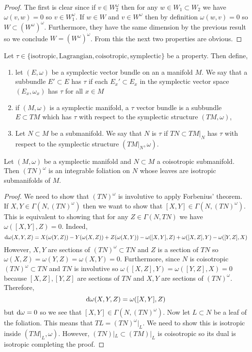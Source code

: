 \documentclass[12pt]{extarticle}
\begin{document}
\begin{proof}
The first is clear since if $v \in W_2^\omega$ then for any $w \in W_1 \subset W_2$ we have $\omega(v, w) = 0$ so $v \in W_1^\omega$. If $w \in W$ and $v \in W^\omega$ then by definition $\omega(w, v) = 0$ so $W \subset (W^\omega)^\omega$. Furthermore, they have the same dimension by the previous result so we conclude $W = (W^\omega)^\omega$. From this the next two properties are obvious.
\end{proof}

\begin{defn}
Let $\tau \in \{ \text{isotropic}, \text{Lagrangian}, \text{coisotropic}, \text{symplectic} \}$ be a property. Then define,
\begin{enumerate}
\item let $(E, \omega)$ be a symplectic vector bundle on an a manifold $M$. We say that a subbundle $E' \subset E$ has $\tau$ if each $E_x' \subset E_x$ in the symplectic vector space $(E_x, \omega_x)$ has $\tau$ for all $x \in M$

\item if $(M, \omega)$ is a symplectic manifold, a $\tau$ vector bundle is a subbundle $E \subset TM$ which has $\tau$ with respect to the symplectic structure $(TM, \omega)$,

\item Let $N \subset M$ be a submanifold. We say that $N$ is $\tau$ if $TN \subset TM|_N$ has $\tau$ with respect to the symplectic structure $(TM|_N, \omega)$. 
\end{enumerate} 
\end{defn}

\begin{prop}
Let $(M, \omega)$ be a symplectic manifold and $N \subset M$ a coisotropic submanifold. Then $(T N)^\omega$ is an integrable foliation on $N$ whose leaves are isotropic submanifolds of $M$.
\end{prop} 

\begin{proof}
We need to show that $(T N)^\omega$ is involutive to apply Forbenius' theorem. If $X, Y \in \Gamma(N, (T N)^\omega)$ then we want to show that $[X, Y] \in \Gamma(N, (T N)^\omega)$. This is equivalent to showing that for any $Z \in \Gamma(N, T N)$ we have $\omega([X, Y], Z) = 0$. Indeed, 
\[ \mathrm{d}\omega(X,Y,Z) = X(\omega(Y,Z)) - Y(\omega(X, Z)) + Z(\omega(X,Y)) - \omega([X,Y], Z) + \omega([X, Z], Y) - \omega([Y, Z], X) \]
However, $X, Y$ are sections of $(T N)^\omega \subset T N$ and $Z$ is a section of $TN$ so $\omega(X, Z) = \omega(Y, Z) = \omega(X, Y) = 0$. Furthermore, since $N$ is coisotropic $(T N)^\omega \subset TN$ and $TN$ is involutive so $\omega([X, Z], Y) = \omega([Y, Z], X) = 0$ because $[X, Z], [Y, Z]$ are sections of $T N$ and $X, Y$ are sections of $(T N)^\omega$. Therefore,
\[ \mathrm{d} \omega(X, Y, Z) = \omega([X, Y], Z) \]
but $\mathrm{d} \omega = 0$ so we see that $[X, Y] \in \Gamma(N, (T N)^\omega)$. Now let $L \subset N$ be a leaf of the foliation. This means that $T L = (T N)^\omega|_L$. We need to show this is isotropic inside $(TM|_L, \omega)$. However, $(T N)|_L \subset (T M)|_L$ is coisotropic so its dual is isotropic completing the proof.
\end{proof}
\end{document}
